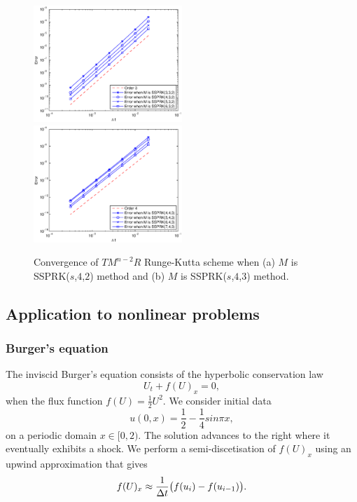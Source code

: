 \begin{figure}
    \centering
    \includegraphics[width=0.5\textwidth]{Pictures/convergence_3rd_ord}%
    \includegraphics[width=0.5\textwidth]{Pictures/convergence_4th_ord_(2)}
    \caption{Convergence of $TM^{n-2}R$ Runge-Kutta scheme when (a) $M$ is SSPRK($s $,$ 4 $,$ 2 $) method and (b) $ M $ is SSPRK($ s $,$ 4 $,$ 3 $) method.}
    \label{fig:convstudy}
\end{figure}

\subsection{Application to nonlinear problems}\label{subsec:nonlinear_problems}

\subsubsection{Burger's equation}\label{subsubsec:burgers}

The inviscid Burger's equation consists of the hyperbolic conservation law
\begin{equation}\label{eq5.5}
    U_{t} + f(U)_{x} = 0,
\end{equation}
when the flux function $f(U) = \frac{1}{2}U^{2}$. We consider initial data
\begin{equation}\label{eq5.6}
    u(0,x)  = \frac{1}{2} - \frac{1}{4}sin{\pi x},
\end{equation}
on a periodic domain $x \in [0,2)$. The solution advances to the right where it eventually exhibits a shock. We perform a semi-discetisation of $f(U)_{x}$ using an upwind approximation \cite{Ketcheson2009} that gives
\begin{equation}\label{eq5.7}
    f(U)_{x} \approx \frac{1}{\Delta t}\bigl(f(u_{i}) - f(u_{i-1})\bigr).
\end{equation}

